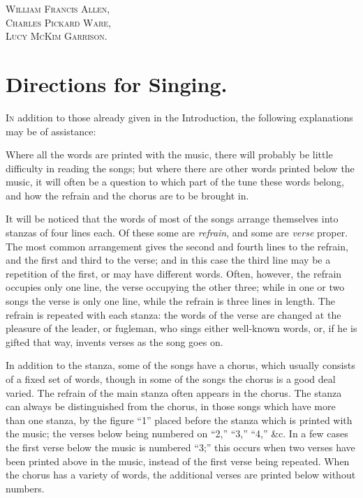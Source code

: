 \documentclass[a5paper,10pt]{book}
\begin{document}
\begin{flushright}
\textsc{William Francis Allen,}\\
\textsc{Charles Pickard Ware,}\\
\textsc{Lucy McKim Garrison.}
\end{flushright}


\chapter{Directions for Singing.}

\textsc{In} addition to those already given in the Introduction, the
following explanations may be of assistance:

Where all the words are printed with the music, there will probably be
little difficulty in reading the songs; but where there are other
words printed below the music, it will often be a question to which
part of the tune these words belong, and how the refrain and the
chorus are to be brought in.

It will be noticed that the words of most of the songs arrange
themselves into stanzas of four lines each.  Of these some are
\emph{refrain}, and some are \emph{verse} proper.  The most common
arrangement gives the second and fourth lines to the refrain, and the
first and third to the verse; and in this case the third line may be a
repetition of the first, or may have different words.  Often, however,
the refrain occupies only one line, the verse occupying the other
three; while in one or two songs the verse is only one line, while the
refrain is three lines in length.  The refrain is repeated with each
stanza: the words of the verse are changed at the pleasure of the
leader, or fugleman, who sings either well-known words, or, if he is
gifted that way, invents verses as the song goes on.

In addition to the stanza, some of the songs have a chorus, which
usually consists of a fixed set of words, though in some of the songs
the chorus is a good deal varied.  The refrain of the main stanza
often appears in the chorus.  The stanza can always be distinguished
from the chorus, in those songs which have more than one stanza, by
the figure ``1'' placed before the stanza which is printed with the
music; the verses below being numbered on ``2,'' ``3,'' ``4,'' \&c.
In a few cases the first verse below the music is numbered ``3;'' this
occurs when two verses have been printed above in the music, instead
of the first verse being repeated.  When the chorus has a variety of
words, the additional verses are printed below without numbers.
\end{document}
